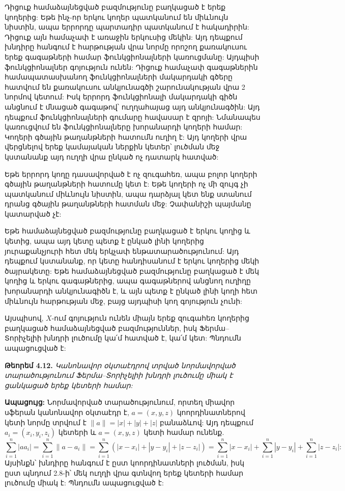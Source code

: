 \documentclass[12pt,a4paper]{article}
\numberwithin{equation}{section}
\numberwithin{figure}{section}
\begin{document}
Դիցուք համաձայնեցված բազմությունը բաղկացած է երեք կողերից: Եթե ինչ-որ երկու կողեր պատկանում են միևնույն նիստին, ապա երրորդը պարտադիր պատկանում է հակադիրին: Դիցուք այն համաչափ է առաջին երկուսից մեկին: Այդ դեպքում խնդիրը հանգում է հարթության վրա նորմը որոշող քառակուսու երեք գագաթների համար ֆունկցիոնալների կառուցմանը: Այդպիսի ֆունկցիոնալներ գոյություն ունեն: Դիցուք համաչափ գագաթներին համապատասխանող ֆունկցիոնալների մակարդակի գծերը հատվում են քառակուսու անկյունագծի շարունակության վրա 2 նորմով կետում: Իսկ երրորդ ֆունկցիոնալի մակարդակի գիծն անցնում է մնացած գագաթով՝ ուղղահայաց այդ անկյունագծին: Այդ դեպքում ֆունկցիոնալների գումարը հավասար է զրոյի: Նմանապես կառուցվում են ֆունկցիոնալները խորանարդի կողերի համար: Կողերի գծային թաղանթների հատումն ուղիղ է: Այդ կողերի վրա վերցնելով երեք կամայական ներքին կետեր՝ լուծման մեջ կստանանք այդ ուղղի վրա ընկած ոչ դատարկ հատված:

Եթե երրորդ կողը դասավորված է ոչ զուգահեռ, ապա բոլոր կողերի գծային թաղանթների հատումը կետ է: Եթե կողերի ոչ մի զույգ չի պատկանում միևնույն նիստին, ապա դարձյալ կետ ենք ստանում դրանց գծային թաղանթների հատման մեջ: Չափանիշի պայմանը կատարված չէ:

Եթե համաձայնեցված բազմությունը բաղկացած է երկու կողից և կետից, ապա այդ կետը պետք է ընկած լինի կողերից յուրաքանչյուրի հետ մեկ երկչափ ենթատարածությունում: Այդ դեպքում կստանանք, որ կետը հանդիսանում է երկու կողերից մեկի ծայրակետը: Եթե համաձայնեցված բազմությունը բաղկացած է մեկ կողից և երկու գագաթներից, ապա գագաթներով անցնող ուղիղը խորանարդի անկյունագիծն է, և այն պետք է ընկած լինի կողի հետ միևնույն հարթության մեջ, բայց այդպիսի կող գոյություն չունի:

Այսպիսով, $X$-ում գոյություն ունեն միայն երեք զուգահեռ կողերից բաղկացած համաձայնեցված բազմություններ, իսկ Ֆերմա--Տորիչելիի խնդրի լուծումը կա՛մ հատված է, կա՛մ կետ: Պնդումն ապացուցված է: 

\textbf{Թեորեմ 4.12.} \textit{Կանոնավոր օկտաէդրով տրված նորմավորված տարածությունում Ֆերմա--Տորիչելիի խնդրի լուծումը միակ է ցանկացած երեք կետերի համար:}

\textbf{Ապացույց:} Նորմավորված տարածությունում, որտեղ միավոր սֆերան կանոնավոր օկտաէդր է, $a = (x, y, z)$ կոորդինատներով կետի նորմը տրվում է $\|a\| = |x| + |y| + |z|$ բանաձևով: Այդ դեպքում $a_i = (x_i, y_i, z_i)$ կետերի և $a = (x, y, z)$ կետի համար ունենք.
\begin{equation*}
    \sum_{i=1}^n |a a_i| = \sum_{i=1}^n \|a - a_i\| = \sum_{i=1}^n (|x - x_i| + |y - y_i| + |z - z_i|) = \sum_{i=1}^n |x - x_i| + \sum_{i=1}^n |y - y_i| + \sum_{i=1}^n |z - z_i|:
\end{equation*}
Այսինքն՝ խնդիրը հանգում է ըստ կոորդինատների լուծման, իսկ ըստ պնդում 2.8-ի՝ մեկ ուղղի վրա գտնվող երեք կետերի համար լուծումը միակ է: Պնդումն ապացուցված է: 
\end{document}
